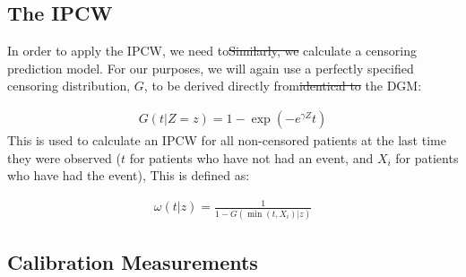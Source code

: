 \documentclass[12pt,PhD,twoside,openright]{muthesis}
\begin{document}
\hypertarget{the-ipcw}{%
\subsection{The IPCW}\label{the-ipcw}}

In order to apply the IPCW, we need to\sout{Similarly, we} calculate a censoring prediction model. For our purposes, we will again use a perfectly specified censoring distribution, \(G\), to be derived directly from\sout{identical to} the DGM:

\[
\begin{array}{c}
G(t|Z=z) = 1-\exp\left(-e^{\gamma Z}t\right)
\end{array}
\]
This is used to calculate an IPCW for all non-censored patients at the last time they were observed (\(t\) for patients who have not had an event, and \(X_i\) for patients who have had the event), This is defined as:

\[
\begin{array}{c}
\omega(t|z) = \frac{1}{1 - G(\min(t,X_i)|z)}
\end{array}
\]

\hypertarget{calibration-measurements}{%
\subsection{Calibration Measurements}\label{calibration-measurements}}
\end{document}
